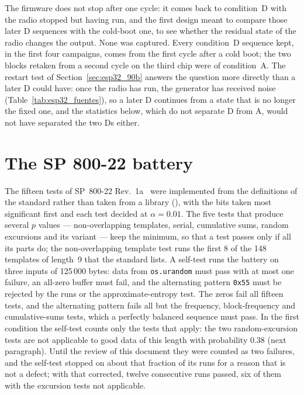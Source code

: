 The firmware does not stop after one cycle: it comes back to condition~D
with the radio stopped but having run, and the first design meant to
compare those later D sequences with the cold-boot one, to see whether
the residual state of the radio changes the output. None was captured.
Every condition~D sequence kept, in the first four campaigns, comes from the
first cycle after a cold boot; the two blocks retaken from a second cycle
on the third chip were of condition~A. The restart test of
Section~\ref{sec:esp32_90b} answers the question more directly than a
later D could have: once the radio has run, the generator has received
noise (Table~\ref{tab:esp32_fuentes}), so a later D continues from a
state that is no longer the fixed one, and the statistics below, which
do not separate D from A, would not have separated the two Ds either.

\section{The SP 800-22 battery}
\label{sec:esp32_sp80022}

The fifteen tests of SP~800-22 Rev.~1a~\cite{bassham_2010_sp80022} were
implemented from the definitions of the standard rather than taken from a
library (), with the bits taken
most significant first and each test decided at $\alpha = 0.01$. The five
tests that produce several $p$ values --- non-overlapping templates,
serial, cumulative sums, random excursions and its variant --- keep the
minimum, so that a test passes only if all its parts do; the
non-overlapping template test runs the first 8 of the 148 templates of
length~9 that the standard lists. A self-test runs the battery on three
inputs of 125\,000 bytes: data from \texttt{os.urandom} must pass with at
most one failure, an all-zero buffer must fail, and the alternating
pattern \texttt{0x55} must be rejected by the runs or the
approximate-entropy test. The zeros fail all fifteen tests,
and the alternating pattern fails all but the frequency, block-frequency
and cumulative-sums tests, which a perfectly balanced sequence must pass.
In the first condition the self-test counts only the tests that apply:
the two random-excursion tests are not applicable to good data of this
length with probability 0.38 (next paragraph). Until the review of this
document they were counted as two failures, and the self-test stopped on
about that fraction of its runs for a reason that is not a defect; with
that corrected, twelve consecutive runs passed, six of them with the
excursion tests not applicable.

